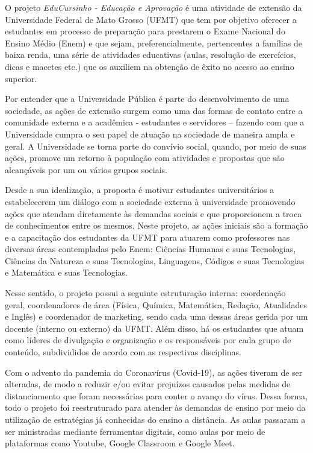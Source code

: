 \pagestyle{empty}
{
\setlength{\parskip}{1mm}
\fontsize{12}{14}
\selectfont
O projeto \textit{EduCursinho - Educação e Aprovação} é uma atividade de extensão 
da Universidade Federal de Mato Grosso (UFMT) que tem por objetivo 
oferecer a estudantes em processo de preparação para prestarem o Exame 
Nacional do Ensino Médio (Enem) e que sejam, preferencialmente, 
pertencentes a famílias de baixa renda, uma série de atividades educativas 
(aulas, resolução de exercícios, dicas e macetes etc.) que os auxiliem na 
obtenção de êxito no acesso ao ensino superior.

Por entender que a Universidade Pública é parte do desenvolvimento de uma 
sociedade, as ações de extensão surgem como uma das formas de contato 
entre a comunidade externa e a acadêmica - estudantes e servidores – 
fazendo com que a Universidade cumpra o seu papel de atuação na sociedade 
de maneira ampla e geral. A Universidade se torna parte do convívio 
social, quando, por meio de suas ações, promove um retorno à população com 
atividades e propostas que são alcançáveis por um ou vários grupos sociais.

Desde a sua idealização, a proposta é motivar estudantes universitários a 
estabelecerem um diálogo com a sociedade externa à universidade promovendo 
ações que atendam diretamente às demandas sociais e que proporcionem a 
troca de conhecimentos entre os mesmos. Neste projeto, as ações iniciais 
são a formação e a capacitação dos estudantes da UFMT para atuarem como 
professores nas diversas áreas contempladas pelo Enem: Ciências Humanas e 
suas Tecnologias, Ciências da Natureza e suas Tecnologias, Linguagens, 
Códigos e suas Tecnologias e Matemática e suas Tecnologias.

Nesse sentido, o projeto possui a seguinte estruturação interna: 
coordenação geral, coordenadores de área (Física, Química, Matemática, 
Redação, Atualidades e Inglês) e coordenador de marketing, sendo cada uma 
dessas áreas gerida por um docente (interno ou externo) da UFMT. Além 
disso, há os estudantes que atuam como líderes de divulgação e organização 
e os responsáveis por cada grupo de conteúdo, subdivididos de acordo com 
as respectivas disciplinas.

Com o advento da pandemia do Coronavírus (Covid-19), as ações tiveram de 
ser alteradas, de modo a reduzir e/ou evitar prejuízos causados pelas 
medidas de distanciamento que foram necessárias para conter o avanço do 
vírus. Dessa forma, todo o projeto foi reestruturado para atender às 
demandas de ensino por meio da utilização de estratégias já conhecidas do 
ensino a distância. As aulas passaram a ser ministradas mediante 
ferramentas digitais, como aulas por meio de plataformas como Youtube, 
Google Classroom e Google Meet.

}
